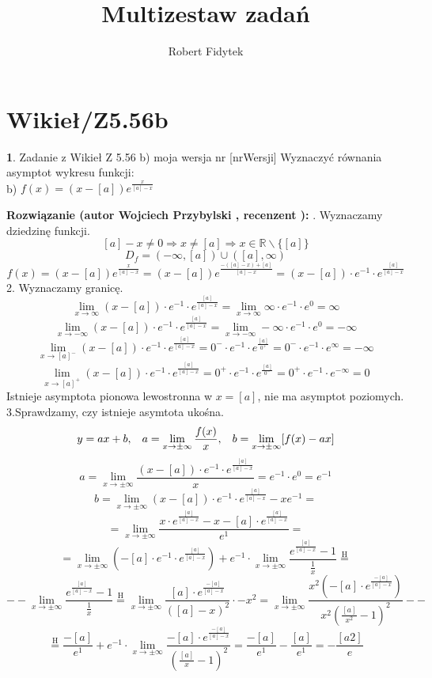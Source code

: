 \documentclass[12pt, a4paper]{article}
\title{Multizestaw zadań}
\author{Robert Fidytek}
\date{}
\theoremstyle{definition} %
\newtheorem{zad}{}
\newcommand{\kategoria}[1]{\section{#1}} %
\newcommand{\zadStart}[1]{\begin{zad}#1\newline} %
\newcommand{\zadStop}{\end{zad}}   %
\newcommand{\rozwStart}[2]{\noindent \textbf{Rozwiązanie (autor #1 , recenzent #2): }\newline} %
\begin{document}
\maketitle


\kategoria{Wikieł/Z5.56b}
\zadStart{Zadanie z Wikieł Z 5.56 b) moja wersja nr [nrWersji]}
Wyznaczyć równania asymptot wykresu funkcji:\\
b) $f(x)=(x-[a])e^{\frac{x}{[a]-x}}$
\zadStop
\rozwStart{Wojciech Przybylski}{}
1. Wyznaczamy dziedzinę funkcji.
$$[a]-x\neq0 \Rightarrow x\neq[a] \Rightarrow x\in\mathbb{R}\backslash\{[a]\}$$
$$D_{f}=(-\infty,[a])\cup([a],\infty)$$
$$
f(x)=(x-[a])e^{\frac{x}{[a]-x}}=(x-[a])e^{\frac{-([a]-x)+[a]}{[a]-x}}=(x-[a])\cdot e^{-1}\cdot e^{\frac{[a]}{[a]-x}}
$$
2. Wyznaczamy granicę. 
$$\lim_{x\to\infty}(x-[a])\cdot e^{-1}\cdot e^{\frac{[a]}{[a]-x}}=\lim_{x\to\infty}\infty\cdot e^{-1}\cdot e^{0}=\infty$$
$$\lim_{x\to-\infty}(x-[a])\cdot e^{-1}\cdot e^{\frac{[a]}{[a]-x}}=\lim_{x\to-\infty}-\infty\cdot e^{-1}\cdot e^{0}=-\infty$$
$$\lim_{x\to[a]^{-}}(x-[a])\cdot e^{-1}\cdot e^{\frac{[a]}{[a]-x}}=0^{-}\cdot e^{-1}\cdot e^{\frac{[a]}{0^{+}}}=0^{-}\cdot e^{-1}\cdot e^{\infty}=-\infty$$
$$\lim_{x\to[a]^{+}}(x-[a])\cdot e^{-1}\cdot e^{\frac{[a]}{[a]-x}}=0^{+}\cdot e^{-1}\cdot e^{\frac{[a]}{0^{-}}}=0^{+}\cdot e^{-1}\cdot e^{-\infty}=0$$
Istnieje asymptota pionowa lewostronna w $x=[a]$, nie ma asymptot poziomych.\\
3.Sprawdzamy, czy istnieje asymtota ukośna.
$$y=ax+b,\hspace{3mm}a=\lim_{x\to\pm\infty}\frac{f(x)}{x},\hspace{3mm}b=\lim_{x\to\pm\infty}[f(x)-ax]$$
$$a=\lim_{x\to\pm\infty}\frac{(x-[a])\cdot e^{-1}\cdot e^{\frac{[a]}{[a]-x}}}{x}=e^{-1}\cdot e^{0}=e^{-1}$$
$$b=\lim_{x\to\pm\infty}(x-[a])\cdot e^{-1}\cdot e^{\frac{[a]}{[a]-x}}-xe^{-1}=$$
$$=\lim_{x\to\pm\infty}\frac{x\cdot e^{\frac{[a]}{[a]-x}}-x-[a]\cdot e^{\frac{[a]}{[a]-x}}}{e^{1}}=$$
$$=\lim_{x\to\pm\infty}(-[a]\cdot e^{-1}\cdot e^{\frac{[a]}{[a]-x}})+e^{-1}\cdot\lim_{x\to\pm\infty}\frac{e^{\frac{[a]}{[a]-x}}-1}{\frac{1}{x}}\stackrel{\text{H}}{=}$$
$$--\lim_{x\to\pm\infty}\frac{e^{\frac{[a]}{[a]-x}}-1}{\frac{1}{x}}\stackrel{\text{H}}{=}\lim_{x\to\pm\infty}\frac{[a]\cdot e^{\frac{-[a]}{[a]-x}}}{([a]-x)^{2}}\cdot-x^{2}=\lim_{x\to\pm\infty}\frac{x^{2}(-[a]\cdot e^{\frac{-[a]}{[a]-x}})}{x^{2}(\frac{[a]}{x^{2}}-1)^{2}}--$$
$$\stackrel{\text{H}}{=}\frac{-[a]}{e^{1}}+e^{-1}\cdot\lim_{x\to\pm\infty}\frac{-[a]\cdot e^{\frac{-[a]}{[a]-x}}}{(\frac{[a]}{x}-1)^{2}}=\frac{-[a]}{e^{1}}-\frac{[a]}{e^{1}}=-\frac{[a2]}{e}$$
\end{document}
